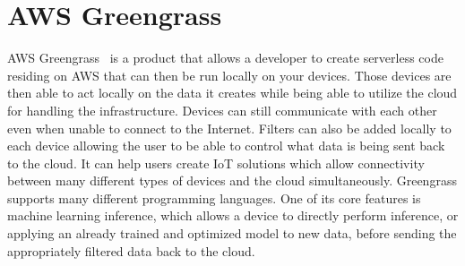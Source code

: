 \section{AWS Greengrass}

AWS Greengrass~\cite{hid-sp18-521-Greengrass} is a product that allows a
developer to create serverless code residing on AWS that can then be run
locally on your devices. Those devices are then able to act locally on the data
it creates while being able to utilize the cloud for handling the infrastructure. 
Devices can still communicate with each other even when unable to connect to the
Internet. Filters can also be added locally to each device allowing the user to be 
able to control what data is being sent back to the cloud. It can help users create
IoT solutions which allow connectivity between many different types of devices
and the cloud simultaneously. Greengrass supports many different programming 
languages. One of its core features is machine learning inference, which allows
a device to directly perform inference, or applying an already trained and 
optimized model to new data, before sending the appropriately filtered data 
back to the cloud.  

